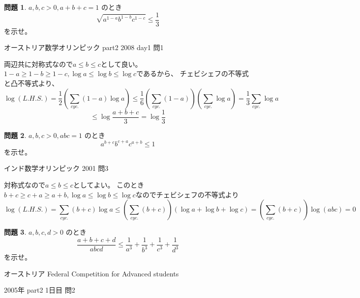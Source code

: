 \documentclass[uplatex, a5paper]{jsarticle}
\makeatletter
\theoremstyle{definition}
\newtheorem{prob}{問題}
\renewenvironment{proof}[1][\proofname]{
  \pushQED{\qed}%
  \normalfont \topsep6\p@\@plus6\p@\relax
  \trivlist
  \item[\hskip\labelsep
    #1\@addpunct{\textbf{.}}]\ignorespaces
}{%
  \popQED\endtrivlist\@endpefalse
}
\providecommand{\proofname}{証明}
\newcommand{\lhs }{ L.H.S. }
\def\qed{\hfill $\Box$}
\makeatother
\begin{document}
\newpage

\begin{prob}
  \(a,b,c>0, a+b+c=1\)
  のとき
  \[
  \sqrt{a^{1-a}b^{1-b}c^{1-c}} \leq \frac{1}{3}
  \]
  を示せ。
  \begin{flushright}
    オーストリア数学オリンピック part2 2008 day1 問1
  \end{flushright}
\end{prob}


\begin{proof}
  両辺共に対称式なので\(a \leq b \leq c\)として良い。
  \(1-a \geq 1-b \geq 1-c , \log a \leq \log b \leq \log c\)であるから、
  チェビシェフの不等式と凸不等式より、
  \[
  \log ( \lhs ) = \frac{1}{2} \left( \sum_{cyc.} (1-a)\log a \right)
  \leq \frac{1}{6} \left( \sum_{cyc.} (1-a) \right) \left( \sum_{cyc.} \log a \right)
  = \frac{1}{3}\sum_{cyc.} \log a
  \]
  \[
  \leq \log \frac{a+b+c}{3} = \log \frac{1}{3}
  \]
\end{proof}









\newpage


\begin{prob}
  \(a,b,c>0,abc=1\)
  のとき
  \[
  a^{b+c}b^{c+a}c^{a+b} \leq 1
  \]
  を示せ。
  \begin{flushright}
    インド数学オリンピック 2001 問3
  \end{flushright}
\end{prob}


\begin{proof}
  対称式なので\(a\leq b \leq c\)としてよい。
  このとき\(b+c \geq c+a \geq a+b , \log a \leq \log b \leq \log c\)なのでチェビシェフの不等式より
  \[
  \log ( \lhs ) = \sum_{cyc.} (b+c)\log a
  \leq \left( \sum_{cyc.}(b+c) \right) \left( \log a + \log b + \log c \right)
  = \left( \sum_{cyc.}(b+c) \right) \log ( abc ) = 0
  \]
\end{proof}









\newpage

\begin{prob}
  \(a,b,c,d>0\)
  のとき
  \[
  \frac{a+b+c+d}{abcd} \leq \frac{1}{a^3} + \frac{1}{b^3} + \frac{1}{c^3} + \frac{1}{d^3}
  \]
  を示せ。
  \begin{flushright}
    オーストリア Federal Competition for Advanced students

    2005年 part2 1日目 問2
  \end{flushright}
\end{prob}
\end{document}

